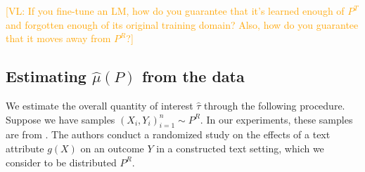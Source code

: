 \documentclass{article}
\newcommand{\vl}[1]{\textcolor{orange}{[VL: #1]}}
\begin{document}
\vl{If you fine-tune an LM, how do you guarantee that it's learned enough of $P^T$ and forgotten enough of its original training domain? Also, how do you guarantee that it moves away from $P^R$?}

\subsection{Estimating $\hat{\mu}(P)$ from the data}

We estimate the overall quantity of interest $\hat{\tau}$ through the following procedure. Suppose we have samples $(X_i,Y_i)_{i=1}^n \sim P^R$. In our experiments, these samples are from \cite{fong2021causal}. The authors conduct a randomized study on the effects of a text attribute $g(X)$ on an outcome $Y$ in a constructed text setting, which we consider to be distributed $P^R$.
\end{document}
